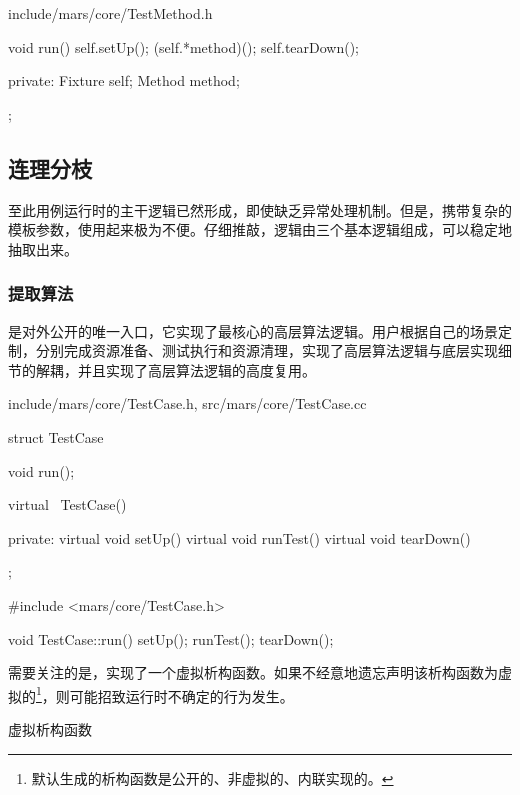 \begin{content}
\begin{diff}{include/mars/core/TestMethod.h}
\begin{minicpp}
{  void run() {
    self.setUp();
    (self.*method)();
    self.tearDown();
  }

private:
  Fixture self;
  Method method;
};
  \end{minicpp}
\end{diff}

\subsection{连理分枝}

至此用例运行时的主干逻辑已然形成，即使缺乏异常处理机制。但是，携带复杂的模板参数，使用起来极为不便。仔细推敲，逻辑由三个基本逻辑组成，可以稳定地抽取出来。

\begin{enum}
\end{enum}

\subsubsection{提取算法}

是对外公开的唯一入口，它实现了最核心的高层算法逻辑。用户根据自己的场景定制，分别完成资源准备、测试执行和资源清理，实现了高层算法逻辑与底层实现细节的解耦，并且实现了高层算法逻辑的高度复用。

\begin{diff}{include/mars/core/TestCase.h, src/mars/core/TestCase.cc}
 \begin{minicpp}
struct TestCase {
  void run();

  virtual ~TestCase() {}

private:
  virtual void setUp() {}
  virtual void runTest() {}
  virtual void tearDown() {}
};
  \end{minicpp}
\tcblower
 \begin{minicpp}
#include <mars/core/TestCase.h>

void TestCase::run() {
  setUp();
  runTest();
  tearDown();
}
  \end{minicpp}
\end{diff}

需要关注的是，实现了一个虚拟析构函数。如果不经意地遗忘声明该析构函数为虚拟的\footnote{默认生成的析构函数是公开的、非虚拟的、内联实现的。}，则可能招致运行时不确定的行为发生。

\begin{episode}{虚拟析构函数}
\begin{content}


\end{content}
\end{episode}
\end{content}
